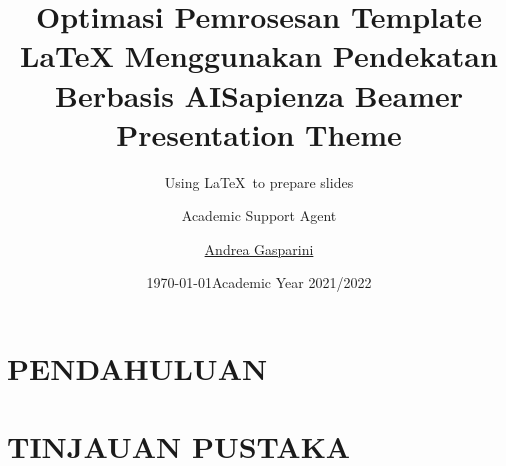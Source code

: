 \documentclass{beamer}
\title{Optimasi Pemrosesan Template LaTeX Menggunakan Pendekatan Berbasis AI}
\author{Academic Support Agent}
\date{\today}
\begin{document}
\maketitle

\begin{abstract}

\end{abstract}

\chapter{PENDAHULUAN}


\chapter{TINJAUAN PUSTAKA}


\usepackage{amsfonts,amsmath,oldgerm}

\newcommand{\testcolor}[1]{\colorbox{#1}{\textcolor{#1}{test}}~\texttt{#1}}



\newcommand{\hrefcol}[2]{\textcolor{cyan}{\href{#1}{#2}}}

\title{Sapienza Beamer Presentation Theme}
\subtitle{Using \LaTeX\ to prepare slides}
\author{\href{mailto:andrea@gasparini.cloud}{Andrea Gasparini}}
\date{Academic Year 2021/2022}
\end{document}
